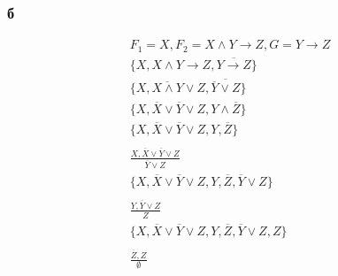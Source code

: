 \documentclass[12pt]{article}
\begin{document}
\subsubsection{б}
\begin{gather*}
  F_1 = X, F_2 = X \wedge Y \rightarrow Z, G = Y \rightarrow Z \\
  \{X, X \wedge Y \rightarrow Z,  \overline{ Y \rightarrow Z }\} \\
  \{X, \overline{ X \wedge Y } \vee Z, \overline {\overline{Y} \vee Z }\} \\
  \{X, \overline{X} \vee \overline{Y} \vee Z, Y \wedge \overline{Z}\} \\
  \{X, \overline{X} \vee \overline{Y} \vee Z, Y, \overline{Z}\} \\
  \\
  \frac{X, \overline{X} \vee \overline{Y} \vee Z}{\overline{Y} \vee Z} \\
  \{X, \overline{X} \vee \overline{Y} \vee Z, Y, \overline{Z}, \overline{Y} \vee Z\} \\
  \\
  \frac{Y, \overline{Y} \vee Z}{Z} \\
  \{X, \overline{X} \vee \overline{Y} \vee Z, Y, \overline{Z}, \overline{Y} \vee Z, Z\} \\
  \\
  \frac{\overline{Z}, Z}{\emptyset} \\
\end{gather*}
\end{document}
